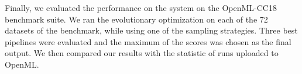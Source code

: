 Finally, we evaluated the performance on the system on the OpenML-CC18 benchmark suite.
We ran the evolutionary optimization on each of the 72 datasets of the
benchmark, while using one of the sampling strategies. Three best pipelines were evaluated
and the maximum of the scores was chosen as the final output. We then compared our
results with the statistic of runs uploaded to OpenML.


